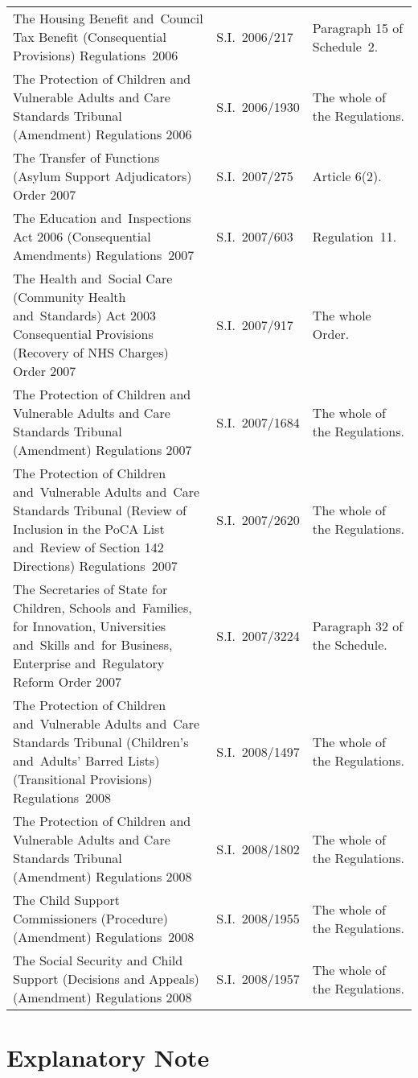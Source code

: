\documentclass[12pt,a4paper]{article}
\begin{document}
{\begin{longtable}{p{154.60547pt}lp{131.7065pt}}
The Housing Benefit and~Council Tax Benefit (Consequential Provisions) Regulations~2006	&S.I.~2006/217	&Paragraph 15 of Schedule~2.\\
The Protection of Children and Vulnerable Adults and Care Standards Tribunal (Amendment) Regulations 2006	&S.I.~2006/1930	&The whole of the Regulations.\\
The Transfer of Functions (Asylum Support Adjudicators) Order 2007	&S.I.~2007/275	&Article 6(2).\\
The Education and~Inspections Act 2006 (Consequential Amendments) Regulations~2007	&S.I.~2007/603	&Regulation~11.\\
The Health and~Social Care (Community Health and~Standards) Act 2003 Consequential Provisions (Recovery of NHS Charges) Order 2007	&S.I.~2007/917	&The whole Order.\\
The Protection of Children and Vulnerable Adults and Care Standards Tribunal (Amendment) Regulations 2007	&S.I.~2007/1684	&The whole of the Regulations.\\
The Protection of Children and~Vulnerable Adults and~Care Standards Tribunal (Review of Inclusion in the PoCA List and~Review of Section 142 Directions) Regulations~2007	&S.I.~2007/2620	&The whole of the Regulations.\\
The Secretaries of State for Children, Schools and~Families, for Innovation, Universities and~Skills and~for Business, Enterprise and~Regulatory Reform Order 2007	&S.I.~2007/3224	&Paragraph 32 of the Schedule.\\
The Protection of Children and~Vulnerable Adults and~Care Standards Tribunal (Children’s and~Adults’ Barred Lists) (Transitional Provisions) Regulations~2008	&S.I.~2008/1497	&The whole of the Regulations.\\
The Protection of Children and Vulnerable Adults and Care Standards Tribunal (Amendment) Regulations 2008	&S.I.~2008/1802	&The whole of the Regulations.\\
The Child Support Commissioners (Procedure) (Amendment) Regulations~2008	&S.I.~2008/1955	&The whole of the Regulations.\\
\hbadness=2772 The Social Security and Child Support (Decisions and Appeals) (Amendment) Regulations 2008	&S.I.~2008/1957	&The whole of the Regulations.\\
\end{longtable}

}

\part{Explanatory Note}
\end{document}
